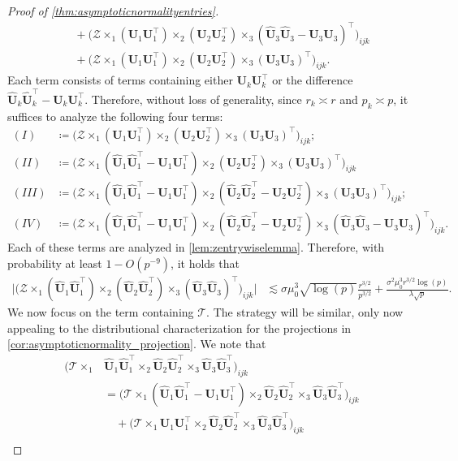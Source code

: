 \documentclass[10pt]{article}
\newcommand{\0}{{\mathbf{0}}}
\newcommand{\1}{{\mathbf{1}}}
\newcommand{\U}{{\mathbf{U}}}
\renewcommand{\t}{^{\top}}
\newcommand{\uhat}{\mathbf{\hat{U}}}
\renewcommand{\hat}{\widehat}
\renewcommand{\hat}{\widehat}
\begin{document}
\begin{proof}[Proof of \cref{thm:asymptoticnormalityentries}]
\begin{align*}
    &\quad + \bigg(\mathcal{Z} \times_1 ( \U_1 \U_1\t ) \times_2 ( \U_2 \U_2\t ) \times_3 (\uhat_3 \uhat_3-\U_3 \U_3)\t \bigg)_{ijk} \\
     &\quad + \bigg(\mathcal{Z} \times_1 ( \U_1 \U_1\t ) \times_2 ( \U_2 \U_2\t ) \times_3 ( \U_3 \U_3)\t \bigg)_{ijk}.
\end{align*}
Each term consists of terms containing either $\U_k \U_k\t$ or the difference $\uhat_k \uhat_k\t - \U_k \U_k\t$.  Therefore, without loss of generality, since $r_k \asymp r$ and $p_k \asymp p$, it suffices to analyze the following four terms:
\begin{align*}
    (I) &\coloneqq \bigg(\mathcal{Z} \times_1 ( \U_1 \U_1\t ) \times_2 ( \U_2 \U_2\t ) \times_3 ( \U_3 \U_3)\t \bigg)_{ijk}; \\
    (II) &\coloneqq \bigg(\mathcal{Z} \times_1 (\uhat_1 \uhat_1\t - \U_1 \U_1\t ) \times_2 ( \U_2 \U_2\t) \times_3 (\U_3 \U_3)\t \bigg)_{ijk} \\
    (III) &\coloneqq \bigg(\mathcal{Z} \times_1 (\uhat_1 \uhat_1\t - \U_1 \U_1\t ) \times_2 (\uhat_2 \uhat_2\t - \U_2 \U_2\t) \times_3 ( \U_3 \U_3)\t \bigg)_{ijk}; \\
    (IV) &\coloneqq \bigg(\mathcal{Z} \times_1 (\uhat_1 \uhat_1\t - \U_1 \U_1\t ) \times_2 (\uhat_2 \uhat_2\t - \U_2 \U_2\t) \times_3 (\uhat_3 \uhat_3 - \U_3 \U_3)\t \bigg)_{ijk}.
\end{align*}
Each of these terms are analyzed in  \cref{lem:zentrywiselemma}.  Therefore, with probability at least $1 - O(p^{-9})$, it holds that
\begin{align*}
   \bigg|  \bigg(\mathcal{Z} \times_1 (\uhat_1 \uhat_1\t) \times_2 (\uhat_2 \uhat_2\t) \times_3 (\uhat_3 \uhat_3)\t \bigg)_{ijk} \bigg| &\lesssim \sigma \mu_0^3 \sqrt{\log(p)} \frac{r^{3/2}}{p^{3/2}} + \frac{\sigma^2 \mu_0^3 r^{3/2} \log(p)}{\lambda \sqrt{p}}.
\end{align*}
We now focus on the term containing $\mathcal{T}$.  The strategy will be similar, only now appealing to the distributional characterization for the projections in  \cref{cor:asymptoticnormality_projection}.  We note that
\begin{align*}
   \bigg(\mathcal{T} \times_1 &\uhat_1 \uhat_1\t \times_2 \uhat_2 \uhat_2\t \times_3 \uhat_3 \uhat_3\t \bigg)_{ijk} \\
   &= \bigg( \mathcal{T} \times_1 (\uhat_1 \uhat_1\t - \U_1\U_1\t) \times_2 \uhat_2 \uhat_2\t \times_3 \uhat_3\uhat_3\t \bigg)_{ijk} \\
   &\quad + \bigg( \mathcal{T} \times_1  \U_1\U_1\t \times_2 \uhat_2 \uhat_2\t \times_3 \uhat_3\uhat_3\t \bigg)_{ijk} \\

\end{align*}
\end{proof}
\end{document}
